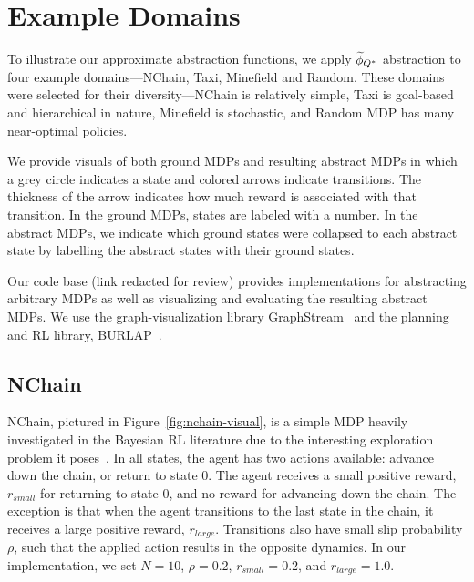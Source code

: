 \section{Example Domains}
To illustrate our approximate abstraction functions, we apply $\widetilde \phi_{Q^*}$ abstraction to four example domains---NChain, Taxi, Minefield and Random. These domains were selected for their diversity---NChain is relatively simple, Taxi is goal-based and hierarchical in nature, Minefield is stochastic, and Random MDP has many near-optimal policies.

We provide visuals of both ground \acp{MDP} and resulting abstract \acp{MDP} in which a grey circle indicates a state and colored arrows indicate transitions. The thickness of the arrow indicates how much reward is associated with that transition. In the ground \acp{MDP}, states are labeled with a number. In the abstract \acp{MDP}, we indicate which ground states were collapsed to each abstract state by labelling the abstract states with their ground states. %

Our code base (link redacted for review) provides implementations for abstracting arbitrary \acp{MDP} as well as visualizing and evaluating the resulting abstract \acp{MDP}. We use the graph-visualization library GraphStream~\cite{graphstream} and the planning and \ac{RL} library, BURLAP~\cite{BURLAPCITATION}.

\subsection{NChain}

NChain, pictured in Figure~\ref{fig:nchain-visual}, is a simple MDP heavily investigated in the Bayesian RL literature due to the interesting exploration problem it poses~\cite{dearden1998bayesian}. In all states, the agent has two actions available: advance down the chain, or return to state 0. The agent receives a small positive reward, $r_{small}$ for returning to state 0, and no reward for advancing down the chain. The exception is that when the agent transitions to the last state in the chain, it receives a large positive reward, $r_{large}$. Transitions also have small slip probability $\rho$, such that the applied action results in the opposite dynamics. In our implementation, we set $N=10$, $\rho=0.2$, $r_{small} = 0.2$, and $r_{large} = 1.0$.

